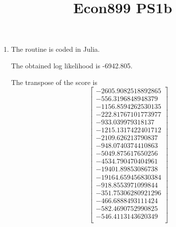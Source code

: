 \documentclass[landscape]{article} %
\title{Econ899 PS1b}
\theoremstyle{definition}
\begin{document}
\begin{enumerate}
\item The routine is coded in Julia. 
	
  The obtained log likelihood is -6942.805.
  
  The transpose of the score is
\begin{equation}
	\left[
	\begin{array}{c}
		-2605.9082518892865 \\
		-556.3196848948379 \\
		-1156.8594262530135 \\
		-222.81767101773977 \\
		-933.039979318137 \\
		-1215.1317422401712 \\
		-2109.626213790837 \\
		-948.0740374410863 \\
		-5049.875617650256 \\
		-4534.790470404961 \\
		-19401.89853086738 \\
		-19164.659456830384 \\
		-918.8553971099844 \\
		-351.75306280921296 \\
		-466.6888493111424 \\
		-582.4690752990825 \\
		-546.4113143620349 \\
	\end{array}
	\right]
\end{equation}


\end{enumerate}
\end{document}
